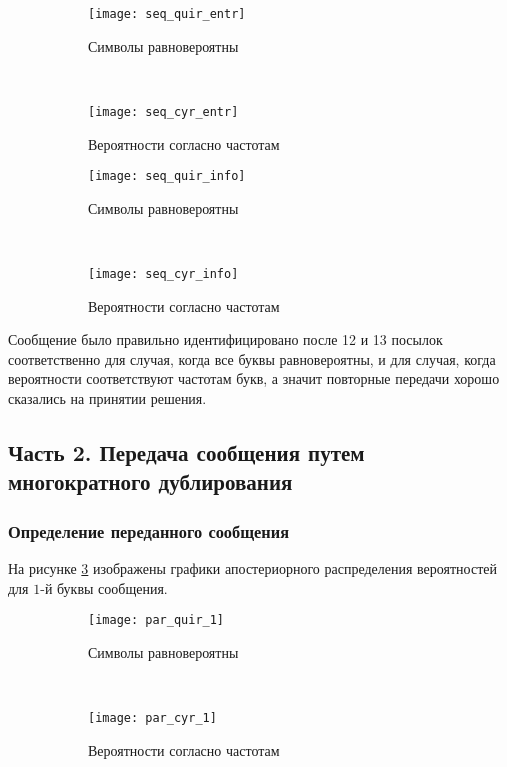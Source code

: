 \begin{figure}[H]
\begin{center}
	\begin{subfigure}[b]{0.45\textwidth}
		\texttt{[image: seq\_quir\_entr]}
		\caption{Символы равновероятны}
	\end{subfigure}
	~
	\begin{subfigure}[b]{0.45\textwidth}
		\texttt{[image: seq\_cyr\_entr]}
		\caption{Вероятности согласно частотам}
	\end{subfigure}
	\caption{}
	\label{pic:3:19}
\end{center}
\end{figure}

\begin{figure}[H]
\begin{center}
	\begin{subfigure}[b]{0.45\textwidth}
		\texttt{[image: seq\_quir\_info]}
		\caption{Символы равновероятны}
	\end{subfigure}
	~
	\begin{subfigure}[b]{0.45\textwidth}
		\texttt{[image: seq\_cyr\_info]}
		\caption{Вероятности согласно частотам}
	\end{subfigure}
	\caption{}
	\label{pic:3:20}
\end{center}
\end{figure}

Сообщение было правильно идентифицировано после 12 и 13 посылок соответственно для случая, когда все буквы равновероятны, и для случая, когда вероятности соответствуют частотам букв, а значит повторные передачи хорошо сказались на принятии решения.

\subsection{Часть 2. Передача сообщения путем многократного дублирования}

\subsubsection{Определение переданного сообщения}

На рисунке \ref{pic:3:21} изображены графики апостериорного распределения вероятностей для $1$-й буквы сообщения.

\begin{figure}[H]
\begin{center}
	\begin{subfigure}[b]{0.45\textwidth}
		\texttt{[image: par\_quir\_1]}
		\caption{Символы равновероятны}
	\end{subfigure}
	~
	\begin{subfigure}[b]{0.45\textwidth}
		\texttt{[image: par\_cyr\_1]}
		\caption{Вероятности согласно частотам}
	\end{subfigure}
	\caption{}
	\label{pic:3:21}
\end{center}
\end{figure}

